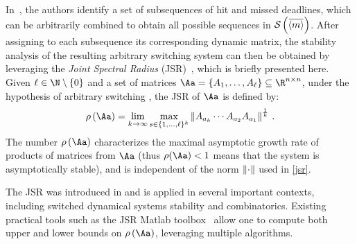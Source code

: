 %
In~\cite{Maggio:2020}, the authors identify a set of subsequences of hit and missed deadlines, which can be arbitrarily combined to obtain all possible sequences in $\sset{}{\overbar{\left<m\right>}}$.
After assigning to each subsequence its corresponding dynamic matrix, the stability analysis of the resulting arbitrary switching system can then be obtained by leveraging the \emph{Joint Spectral Radius} (JSR)~\cite{Jungers2009}, which is briefly presented here.
%
Given $\ell\in\N\setminus \left\{ 0 \right\} $ and a set of
matrices $\Aa = \{A_1, \ldots, A_\ell \} \subseteq \R^{n\times n}$,
under the hypothesis of arbitrary switching , the JSR of $\Aa$ is defined by:
\begin{equation}
  \label{jsr} \rho\left(\Aa\right)= \lim_{k\rightarrow\infty}
  \max_{s\in\{1,\ldots,\ell\}^k} \norm{A_{a_k}
  \cdots A_{a_2}A_{a_1}}^{\frac{1}{k}} \,.
\end{equation}
The number $\rho\left(\Aa\right)$ characterizes the maximal asymptotic
growth rate of products of matrices from $\Aa$
(thus  $\rho(\Aa)<1$ means that the system is
asymptotically stable), and is independent of
the norm $\left\lVert\cdot\right\rVert$ used in \eqref{jsr}.

The JSR was introduced in \cite{rota} and is applied in several important
contexts, including switched dynamical systems stability and
combinatorics. 
Existing practical tools such
as the JSR Matlab toolbox~\cite{vankeerberghen2014jsr} allow one to
compute both upper and lower bounds on $\rho\left(\Aa\right)$, leveraging multiple algorithms.

